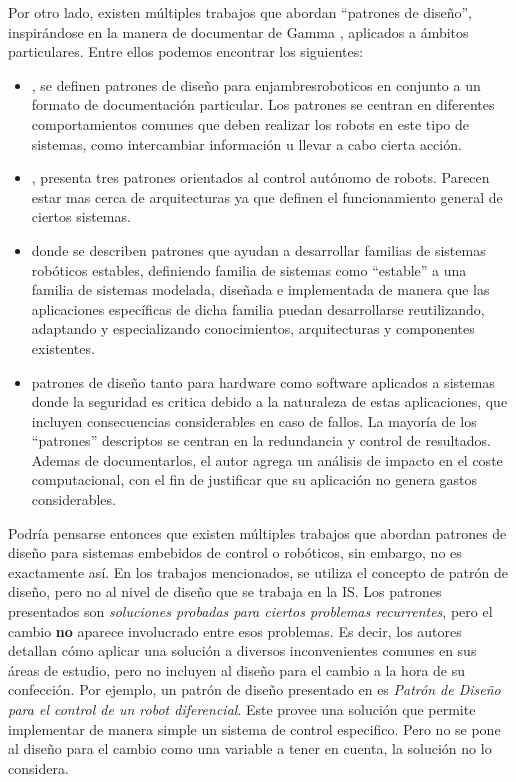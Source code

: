 Por otro lado, existen múltiples trabajos que abordan ``patrones de diseño'',  inspirándose en la manera de documentar de Gamma \cite{Gamma:1995:DPE:186897}, aplicados a ámbitos particulares. Entre ellos podemos encontrar los siguientes:

\begin{itemize}
\item \cite{enjambre}, se definen patrones de diseño para \gls{enjambresroboticos} en conjunto a un formato de documentación particular. Los patrones se centran en diferentes comportamientos comunes que deben realizar los robots en este tipo de sistemas, como intercambiar información u llevar a cabo cierta acción.

\item \cite{patterns_2013}, presenta tres patrones orientados al control autónomo de robots. Parecen estar mas cerca de arquitecturas ya que definen el funcionamiento general de ciertos sistemas.

\item \cite{stable} donde se describen patrones que ayudan a desarrollar familias de sistemas robóticos estables, definiendo familia de sistemas como ``estable'' a una familia de sistemas modelada, diseñada e implementada de manera que las aplicaciones específicas de dicha familia puedan desarrollarse reutilizando, adaptando y especializando conocimientos, arquitecturas y componentes existentes.

\item \cite{critical} patrones de diseño tanto para hardware como software aplicados a sistemas donde la seguridad es critica debido a la naturaleza de estas aplicaciones, que incluyen consecuencias considerables en caso de fallos. La mayoría de los ``patrones'' descriptos se centran en la redundancia y control de resultados. Ademas de documentarlos, el autor agrega un análisis de impacto en el coste computacional, con el fin de justificar que su aplicación no genera gastos considerables.

\end{itemize}

Podría pensarse entonces que existen múltiples trabajos que abordan patrones de diseño para sistemas embebidos de control o robóticos, sin embargo, no es exactamente así. En los trabajos mencionados, se utiliza el concepto de patrón de diseño, pero no al nivel de diseño que se trabaja en la IS. Los patrones presentados son \textit{soluciones probadas para ciertos problemas recurrentes}, pero el cambio \textbf{no} aparece involucrado entre esos problemas. Es decir, los autores detallan cómo aplicar una solución a diversos inconvenientes comunes en sus áreas de estudio, pero no incluyen al diseño para el cambio a la hora de su confección. Por ejemplo, un patrón de diseño presentado en \cite{robotArg} es \textit{Patrón de Diseño para el control de un robot diferencial}. Este provee una solución que permite implementar de manera simple un sistema de control especifico. Pero no se pone al diseño para el cambio como una variable a tener en cuenta, la solución no lo considera.

